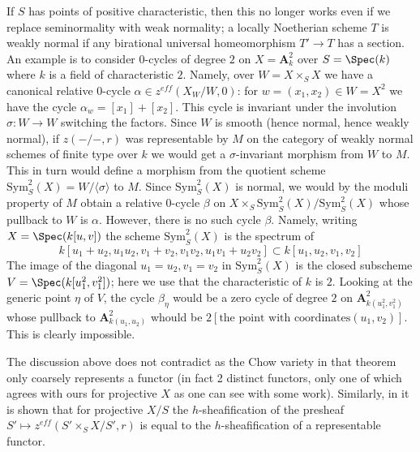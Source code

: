 \begin{remark}
\medskip\noindent
If $S$ has points of positive characteristic, then this no longer works
even if we replace seminormality with weak normality; a locally Noetherian
scheme $T$ is weakly normal if any birational universal homeomorphism
$T' \to T$ has a section. An example is to consider $0$-cycles of degree
$2$ on $X = \mathbf{A}^2_k$ over $S = \Spec(k)$ where $k$ is a field of
characteristic $2$. Namely, over $W = X \times_S X$ we have a canonical
relative $0$-cycle $\alpha \in z^{eff}(X_W/W, 0)$: for
$w = (x_1, x_2) \in W = X^2$ we have the cycle $\alpha_w = [x_1] + [x_2]$.
This cycle is invariant under the involution $\sigma : W \to W$ switching
the factors. Since $W$ is smooth (hence normal, hence weakly normal), if
$z(-/-, r)$ was representable by $M$ on the category of weakly normal
schemes of finite type over $k$ we would get a $\sigma$-invariant
morphism from $W$ to $M$. This in turn would define a morphism from the
quotient scheme $\text{Sym}^2_S(X) = W/\langle \sigma \rangle$ to $M$.
Since $\text{Sym}^2_S(X)$ is normal, we would by the moduli property of $M$
obtain a relative $0$-cycle $\beta$ on
$X \times_S \text{Sym}^2_S(X) / \text{Sym}^2_S(X)$
whose pullback to $W$ is $\alpha$. However, there is no such cycle $\beta$.
Namely, writing $X = \Spec(k[u, v])$ the scheme
$\text{Sym}^2_S(X)$ is the spectrum of
$$
k[u_1 + u_2, u_1u_2, v_1 + v_2, v_1v_2, u_1v_1 + u_2v_2]
\subset
k[u_1, u_2, v_1, v_2]
$$
The image of the diagonal $u_1 = u_2, v_1 = v_2$ in $\text{Sym}^2_S(X)$
is the closed subscheme $V = \Spec(k[u_1^2, v_1^2])$; here we use that
the characteristic of $k$ is $2$. Looking at the
generic point $\eta$ of $V$, the cycle $\beta_\eta$ would be a zero
cycle of degree $2$ on $\mathbf{A}^2_{k(u_1^2, v_1^2)}$
whose pullback to $\mathbf{A}^2_{k(u_1, u_2)}$ whould be
$2[\text{the point with coordinates} (u_1, v_2)]$.
This is clearly impossible.

\medskip\noindent
The discussion above does not contradict \cite[Theorem 4.13]{KRC} as the Chow
variety in that theorem only coarsely represents a functor (in fact 2
distinct functors, only one of which agrees with ours for projective $X$
as one can see with some work). Similarly, in \cite[Section 4.4]{SV}
it is shown that for projective $X/S$ the $h$-sheafification of the presheaf
$S' \mapsto z^{eff}(S' \times_S X/S', r)$ is equal to the $h$-sheafification of
a representable functor.
\end{remark}

